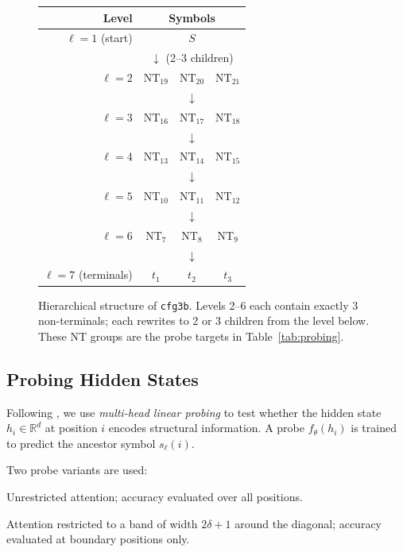 \documentclass[10pt,twocolumn]{article}
\begin{document}
\begin{figure}[t]
\centering
\footnotesize
\setlength{\tabcolsep}{6pt}
\renewcommand{\arraystretch}{1.15}
\begin{tabular}{r@{\enspace}ccc}
\toprule
\textbf{Level} & \multicolumn{3}{c}{\textbf{Symbols}} \\
\midrule
$\ell=1$ (start) & \multicolumn{3}{c}{$S$} \\
& \multicolumn{3}{c}{$\downarrow$ (2--3 children)} \\
$\ell=2$ & $\mathrm{NT}_{19}$ & $\mathrm{NT}_{20}$ & $\mathrm{NT}_{21}$ \\
& \multicolumn{3}{c}{$\downarrow$} \\
$\ell=3$ & $\mathrm{NT}_{16}$ & $\mathrm{NT}_{17}$ & $\mathrm{NT}_{18}$ \\
& \multicolumn{3}{c}{$\downarrow$} \\
$\ell=4$ & $\mathrm{NT}_{13}$ & $\mathrm{NT}_{14}$ & $\mathrm{NT}_{15}$ \\
& \multicolumn{3}{c}{$\downarrow$} \\
$\ell=5$ & $\mathrm{NT}_{10}$ & $\mathrm{NT}_{11}$ & $\mathrm{NT}_{12}$ \\
& \multicolumn{3}{c}{$\downarrow$} \\
$\ell=6$ & $\mathrm{NT}_{7}$ & $\mathrm{NT}_{8}$ & $\mathrm{NT}_{9}$ \\
& \multicolumn{3}{c}{$\downarrow$} \\
$\ell=7$ (terminals) & $t_1$ & $t_2$ & $t_3$ \\
\bottomrule
\end{tabular}
\caption{Hierarchical structure of \texttt{cfg3b}. Levels 2--6 each contain exactly 3 non-terminals; each rewrites to 2 or 3 children from the level below. These NT groups are the probe targets in Table~\ref{tab:probing}.}
\label{fig:cfg3b}
\end{figure}

\subsection{Probing Hidden States}

Following \citet{allen-zhu2023physics}, we use \emph{multi-head linear probing} to test whether the hidden state $h_i \in \mathbb{R}^d$ at position $i$ encodes structural information. A probe $f_\theta(h_i)$ is trained to predict the ancestor symbol $s_\ell(i)$.

Two probe variants are used:
\begin{description}[leftmargin=*, itemsep=0pt]
  \item[Full probe (R4).] Unrestricted attention; accuracy evaluated over all positions.
  \item[Diagonal probe (R5).] Attention restricted to a band of width $2\delta+1$ around the diagonal; accuracy evaluated at boundary positions only.
\end{description}
\end{document}
